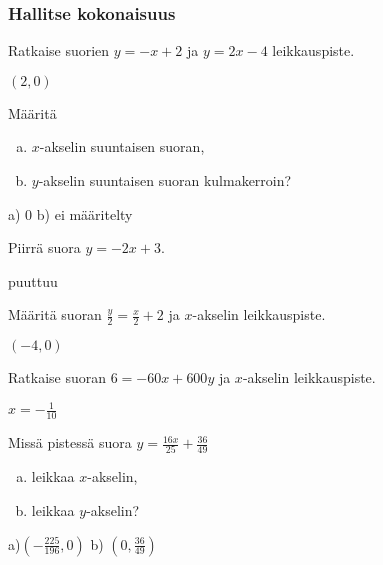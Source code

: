 \begin{tehtavasivu}
\subsubsection*{Hallitse kokonaisuus}

\begin{tehtava}
Ratkaise suorien $y=-x+2$ ja $y=2x-4$ leikkauspiste.
\begin{vastaus}
$(2, 0)$
\end{vastaus}
\end{tehtava}

\begin{tehtava}
Määritä
\begin{enumerate}[a)]
\item $x$-akselin suuntaisen suoran,
\item $y$-akselin suuntaisen suoran kulmakerroin?
\end{enumerate}
\begin{vastaus}
a) $0$ b) ei määritelty %
\end{vastaus}
\end{tehtava}

\begin{tehtava}
Piirrä suora $y=-2x+3$.
\begin{vastaus}
puuttuu
\end{vastaus}
\end{tehtava}

\begin{tehtava}
Määritä suoran $\frac{y}{2}=\frac{x}{2}+2$ ja $x$-akselin leikkauspiste.
\begin{vastaus}
$(-4, 0)$
\end{vastaus}
\end{tehtava}

\begin{tehtava}
Ratkaise suoran $6=-60x+600y$ ja $x$-akselin leikkauspiste.
\begin{vastaus}
$x=-\frac{1}{10}$
\end{vastaus}
\end{tehtava}

\begin{tehtava}
Missä pistessä suora $y=\frac{16x}{25}+\frac{36}{49}$
\begin{enumerate}[a)]
\item leikkaa $x$-akselin,
\item leikkaa $y$-akselin?
\end{enumerate}
\begin{vastaus}
a)$(-\frac{225}{196}, 0)$ b) $(0, \frac{36}{49})$
\end{vastaus}
\end{tehtava}


\end{tehtavasivu}
